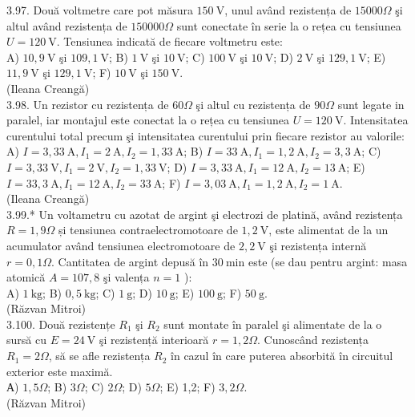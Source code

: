 \documentclass[10pt]{article}
\begin{document}
3.97. Două voltmetre care pot măsura $150 \mathrm{~V}$, unul având rezistența de $15000 \Omega$ şi altul având rezistența de $150000 \Omega$ sunt conectate în serie la o rețea cu tensiunea $U=120 \mathrm{~V}$. Tensiunea indicată de fiecare voltmetru este:\\ A) $10,9 \mathrm{~V}$ şi $109,1 \mathrm{~V}$; B) $1 \mathrm{~V}$ şi $10 \mathrm{~V}$; C) $100 \mathrm{~V}$ şi $10 \mathrm{~V}$; D) $2 \mathrm{~V}$ şi $129,1 \mathrm{~V}$; E) $11,9 \mathrm{~V}$ şi $129,1 \mathrm{~V}$; F) $10 \mathrm{~V}$ şi $150 \mathrm{~V}$.\\ (Ileana Creangă)\\

3.98. Un rezistor cu rezistența de $60 \Omega$ şi altul cu rezistența de $90 \Omega$ sunt legate in paralel, iar montajul este conectat la o rețea cu tensiunea $U=120 \mathrm{~V}$. Intensitatea curentului total precum şi intensitatea curentului prin fiecare rezistor au valorile:\\ A) $I=3,33 \mathrm{~A} , I_{1}=2 \mathrm{~A} , I_{2}=1,33 \mathrm{~A}$; B) $I=33 \mathrm{~A} , I_{1}=1,2 \mathrm{~A} , I_{2}=3,3 \mathrm{~A}$; C) $I=3,33 \mathrm{~V} , I_{1}=2 \mathrm{~V} , I_{2}=1,33 \mathrm{~V}$; D) $I=3,33 \mathrm{~A} , I_{1}=12 \mathrm{~A} , I_{2}=13 \mathrm{~A}$; E) $I=33,3 \mathrm{~A} , I_{1}=12 \mathrm{~A} , I_{2}=33 \mathrm{~A}$; F) $I=3,03 \mathrm{~A} , I_{1}=1,2 \mathrm{~A} , I_{2}=1 \mathrm{~A}$.\\ (Ileana Creangă)\\

3.99.* Un voltametru cu azotat de argint şi electrozi de platină, având rezistența $R=1,9 \Omega$ și tensiunea contraelectromotoare de $1,2 \mathrm{~V}$, este alimentat de la un acumulator având tensiunea electromotoare de $2,2 \mathrm{~V}$ şi rezistența internă $r=0,1 \Omega$. Cantitatea de argint depusă în $30 \mathrm{~min}$ este (se dau pentru argint: masa atomică $A=107,8$ şi valența $n=1$ ):\\ A) $1 \mathrm{~kg}$; B) $0,5 \mathrm{~kg}$; C) $1 \mathrm{~g}$; D) $10 \mathrm{~g}$; E) $100 \mathrm{~g}$; F) $50 \mathrm{~g}$.\\ (Răzvan Mitroi)\\

3.100. Două rezistențe $R_{1}$ şi $R_{2}$ sunt montate în paralel şi alimentate de la o sursă cu $E=24 \mathrm{~V}$ şi rezistență interioară $r=1,2 \Omega$. Cunoscând rezistența $R_{1}=2 \Omega$, să se afle rezistența $R_{2}$ în cazul în care puterea absorbită în circuitul exterior este maximă.\\ А) $1,5 \Omega$; B) $3 \Omega$; C) $2 \Omega$; D) $5 \Omega$; E) 1,2; F) $3,2 \Omega$.\\ (Răzvan Mitroi)\\
\end{document}
